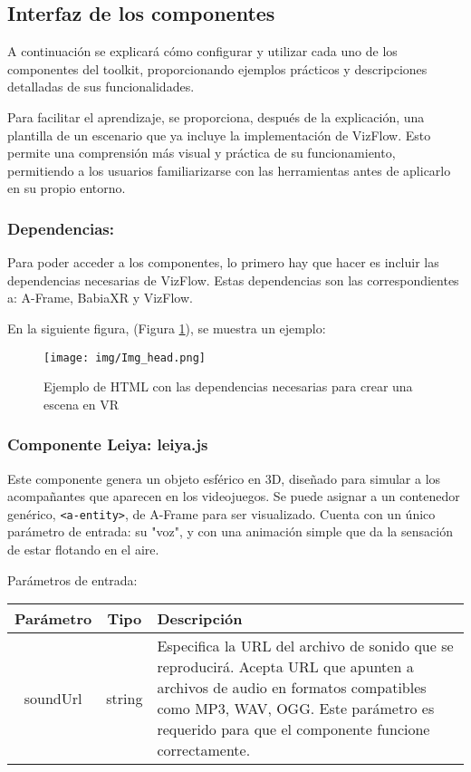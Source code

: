 \documentclass[a4paper, 12pt]{book}
\begin{document}
\subsection{Interfaz de los componentes}

A continuación se explicará cómo configurar y utilizar cada uno de los componentes del toolkit, proporcionando ejemplos prácticos y descripciones detalladas de sus funcionalidades. 

Para facilitar el aprendizaje, se proporciona, después de la explicación, una plantilla de un escenario que ya incluye la implementación de VizFlow. Esto permite una comprensión más visual y práctica de su funcionamiento, permitiendo a los usuarios familiarizarse con las herramientas antes de aplicarlo en su propio entorno.

\subsubsection*{Dependencias:}
Para poder acceder a los componentes, lo primero hay que hacer es incluir las dependencias necesarias de VizFlow. Estas dependencias son las correspondientes a: A-Frame, BabiaXR y VizFlow.

\newpage
En la siguiente figura, (Figura \ref{fig:head}), se muestra un ejemplo:

\begin{figure}[H]
\centering
\texttt{[image: img/Img\_head.png]}
\caption{Ejemplo de HTML con las dependencias necesarias para crear una escena en VR}
  \label{fig:head}
\end{figure}


\subsubsection*{Componente Leiya: leiya.js}
Este componente genera un objeto esférico en 3D, diseñado para simular a los acompañantes que aparecen en los videojuegos. Se puede asignar a un contenedor genérico, \texttt{<a-entity>}, de A-Frame para ser visualizado. Cuenta con un único parámetro de entrada: su "voz", y con una animación simple que da la sensación de estar flotando en el aire. 

Parámetros de entrada:

\vspace{1em} 
\begin{tabular}{|c|c|p{10cm}|}
\hline
\textbf{Parámetro} & \textbf{Tipo} & \textbf{Descripción} \\

\hline
soundUrl & string & Especifica la URL del archivo de sonido que se reproducirá. Acepta URL que apunten a archivos de audio en formatos compatibles como MP3, WAV, OGG. Este parámetro es requerido para que el componente funcione correctamente. \\
\hline
\end{tabular}
\end{document}
